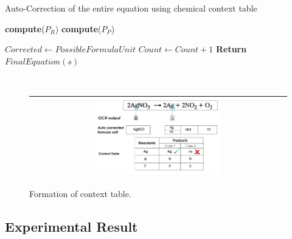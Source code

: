 \documentclass[oneside,a4paper,12pt]{book}
\begin{document}
\begin{algorithm}[!htb]
\large
\caption{Auto-Correction of the entire equation using chemical context table}
\begin{algorithmic}[1]
		\State \textbf{compute}($P_{R}$)  
		\Statex {}
		\State \textbf{compute}($P_{P}$)  \
		\Statex {}
		
			\State $Corrected \leftarrow PossibleFormulaUnit$
			\State $Count \leftarrow Count + 1$
		\EndIf
	\EndFor
		\Statex {}
	\EndIf
	\State  \textbf{Return} {$FinalEquation(s)$}
\EndProcedure
\end{algorithmic}
\label{alg:alg3}
\end{algorithm}

\begin{figure}[!htb]
\center\ 
\begin{tabular}{|c|} 
\hline
\includegraphics[width=0.5\textwidth]{equationContext.png}\\
\hline
\end{tabular} 
\caption{Formation of context table. }
\label{context} 
\end{figure}


\subsection{Experimental Result}
\label{sc_exp_res}
\end{document}
